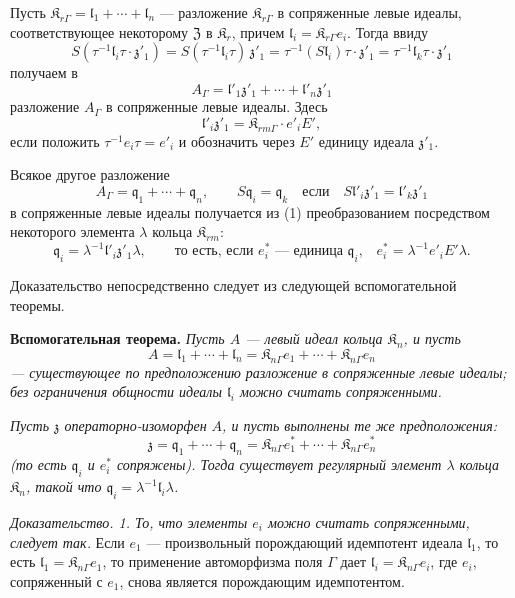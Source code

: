 \documentclass[11pt]{article}
\begin{document}
Пусть \(\mathfrak K_{r\Gamma}=\mathfrak l_1+\cdots+\mathfrak l_n\) --- разложение \(\mathfrak K_{r\Gamma}\) в сопряженные левые идеалы, соответствующее некоторому \(\mathfrak Z\) в \(\mathfrak K_r\), причем \(\mathfrak l_i=\mathfrak K_{r\Gamma}e_i\). Тогда ввиду
\[
S(\tau^{-1}\mathfrak l_i\tau\cdot\mathfrak z'_1)
=S(\tau^{-1}\mathfrak l_i\tau)\,\mathfrak z'_1
=\tau^{-1}(S\mathfrak l_i)\tau\cdot\mathfrak z'_1
=\tau^{-1}\mathfrak l_k\tau\cdot\mathfrak z'_1
\]
получаем в
\[
\tag{1}
A_\Gamma=\mathfrak l'_1\mathfrak z'_1+\cdots+\mathfrak l'_n\mathfrak z'_1
\]
разложение \(A_\Gamma\) в сопряженные левые идеалы. Здесь
\[
\mathfrak l'_i\mathfrak z'_1=\mathfrak K_{rm\Gamma}\cdot e'_iE',
\]
если положить \(\tau^{-1}e_i\tau=e'_i\) и обозначить через \(E'\) единицу идеала \(\mathfrak z'_1\).

Всякое другое разложение
\[
\tag{2}
A_\Gamma=\mathfrak q_1+\cdots+\mathfrak q_n,\qquad
S\mathfrak q_i=\mathfrak q_k\quad\text{если}\quad
S\mathfrak l'_i\mathfrak z'_1=\mathfrak l'_k\mathfrak z'_1
\]
в сопряженные левые идеалы получается из (1) преобразованием посредством некоторого элемента \(\lambda\) кольца \(\mathfrak K_{rm}\):
\[
\mathfrak q_i=\lambda^{-1}\mathfrak l'_i\mathfrak z'_1\lambda,
\qquad
\text{то есть, если \(e_i^*\) --- единица \(\mathfrak q_i\),}\quad
e_i^*=\lambda^{-1}e'_iE'\lambda.
\]

Доказательство непосредственно следует из следующей вспомогательной теоремы.

\textbf{Вспомогательная теорема.} \emph{Пусть \(A\) --- левый идеал кольца \(\mathfrak K_n\), и пусть}
\[
A=\mathfrak l_1+\cdots+\mathfrak l_n
=\mathfrak K_{n\Gamma}e_1+\cdots+\mathfrak K_{n\Gamma}e_n
\]
\emph{--- существующее по предположению разложение в сопряженные левые идеалы; без ограничения общности идеалы \(\mathfrak l_i\) можно считать сопряженными.}

\emph{Пусть \(\mathfrak z\) операторно-изоморфен \(A\), и пусть выполнены те же предположения:}
\[
\mathfrak z=\mathfrak q_1+\cdots+\mathfrak q_n
=\mathfrak K_{n\Gamma}e_1^*+\cdots+\mathfrak K_{n\Gamma}e_n^*
\]
\emph{(то есть \(\mathfrak q_i\) и \(e_i^*\) сопряжены). Тогда существует регулярный элемент \(\lambda\) кольца \(\mathfrak K_n\), такой что \(\mathfrak q_i=\lambda^{-1}\mathfrak l_i\lambda\).}

\emph{Доказательство. 1. То, что элементы \(e_i\) можно считать сопряженными, следует так.} Если \(e_1\) --- произвольный порождающий идемпотент идеала \(\mathfrak l_1\), то есть \(\mathfrak l_1=\mathfrak K_{n\Gamma}e_1\), то применение автоморфизма поля \(\Gamma\) дает \(\mathfrak l_i=\mathfrak K_{n\Gamma}e_i\), где \(e_i\), сопряженный с \(e_1\), снова является порождающим идемпотентом.
\end{document}
